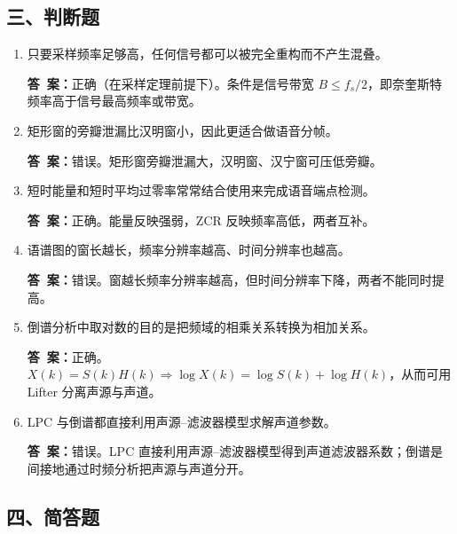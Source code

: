 \documentclass[10.5pt]{ctexart}
\newenvironment{qlist}
  {\begin{enumerate}[label={\sffamily\bfseries\color{accent}\arabic*.},leftmargin=2.4em,labelsep=0.55em,itemsep=0.62em,topsep=0.15em,parsep=0.3em,partopsep=0pt]}
  {\end{enumerate}}
\newcommand{\anslabel}{{\sffamily\bfseries\color{accent}答\ 案：}\hspace{0.35em}}
\newcommand{\ans}[1]{\par\vspace{2.15\baselineskip}\begin{ansbox}\anslabel #1\end{ansbox}}
\begin{document}
\subsection{三、判断题}

\begin{qlist}

\item 只要采样频率足够高，任何信号都可以被完全重构而不产生混叠。
\ans{正确（在采样定理前提下）。条件是信号带宽 $B\le f_s/2$，即奈奎斯特频率高于信号最高频率或带宽。}

\item 矩形窗的旁瓣泄漏比汉明窗小，因此更适合做语音分帧。
\ans{错误。矩形窗旁瓣泄漏大，汉明窗、汉宁窗可压低旁瓣。}

\item 短时能量和短时平均过零率常常结合使用来完成语音端点检测。
\ans{正确。能量反映强弱，ZCR 反映频率高低，两者互补。}

\item 语谱图的窗长越长，频率分辨率越高、时间分辨率也越高。
\ans{错误。窗越长频率分辨率越高，但时间分辨率下降，两者不能同时提高。}

\item 倒谱分析中取对数的目的是把频域的相乘关系转换为相加关系。
\ans{正确。$X(k)=S(k)H(k)\Rightarrow \log X(k)=\log S(k)+\log H(k)$，从而可用 Lifter 分离声源与声道。}

\item LPC 与倒谱都直接利用声源--滤波器模型求解声道参数。
\ans{错误。LPC 直接利用声源--滤波器模型得到声道滤波器系数；倒谱是间接地通过时频分析把声源与声道分开。}

\end{qlist}

\subsection{四、简答题}
\end{document}
